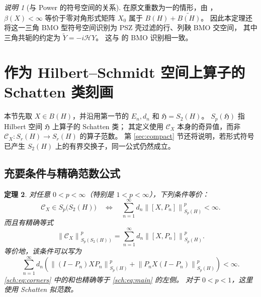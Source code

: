 \documentclass[UTF8,11pt,a4paper,fontset=fandol]{ctexart}
\newtheorem{theorem}{定理}[section]
\theoremstyle{remark}
\newtheorem{remark}[theorem]{说明}
\newcommand{\TriH}{\mathcal H}
\newcommand{\CC}{\mathcal C}
\newcommand{\norm}[1]{\left\lVert #1\right\rVert}
\newcommand{\HS}{\mathfrak H}
\numberwithin{equation}{section}
\begin{document}
\begin{remark}[与 Power 的符号空间的关系]
在原文重数为一的情形，由 \cite[Theorem 2.3]{Power}，
$\beta(X)<\infty$ 等价于零对角形式矩阵
$X_0$ 属于 $B(H)+\widetilde{B(H)}$。
因此本定理还将这一三角 BMO 型符号空间识别为 PSZ 壳过滤的行、列鞅 BMO 交空间，
其中三角共轭的约定为 $\widetilde Y=-i\TriH Y$。
这与 \cite[Theorem 3.16]{PSZ} 的 BMO 识别相一致。
\end{remark}

\section{作为 Hilbert--Schmidt 空间上算子的 Schatten 类刻画}

本节先取 $X\in B(H)$，并沿用第一节的 $E_n,d_n$ 和 $\HS=S_2(H)$。
$S_p(\HS)$ 指 Hilbert 空间 $\HS$ 上算子的 Schatten 类；
其定义使用 $\CC_X$ 本身的奇异值，而非 $\CC_X:S_r(H)\to S_r(H)$ 的算子范数。
第 \ref{sec:compact} 节还将说明，若形式符号已产生 $S_2(H)$ 上的有界交换子，同一公式仍然成立。

\subsection{充要条件与精确范数公式}

\begin{theorem}\label{sch:thm:main}
对任意 $0<p<\infty$（特别是 $1<p<\infty$），下列条件等价：
\[
 \boxed{\quad
 \CC_X\in S_p\bigl(S_2(H)\bigr)
 \quad\Longleftrightarrow\quad
 \sum_{n=1}^{\infty}d_n\norm{[X,P_n]}_{S_p(H)}^p<\infty.
 \quad}
\]
而且有精确等式
\begin{equation}\label{sch:eq:main}
 \norm{\CC_X}_{S_p(S_2(H))}^p
 =\sum_{n=1}^{\infty}d_n\norm{[X,P_n]}_{S_p(H)}^p.
\end{equation}
等价地，该条件可以写为
\begin{equation}\label{sch:eq:corners}
 \boxed{\quad
 \sum_{n=1}^{\infty}d_n\left(
 \norm{(I-P_n)XP_n}_{S_p(H)}^p
 +\norm{P_nX(I-P_n)}_{S_p(H)}^p\right)<\infty.
 \quad}
\end{equation}
\eqref{sch:eq:corners} 中的和也精确等于 \eqref{sch:eq:main} 的左侧。
对于 $0<p<1$，这里使用 Schatten 拟范数。
\end{theorem}
\end{document}
